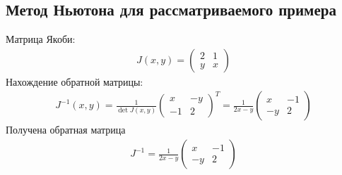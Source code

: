 \subsection{Метод Ньютона для рассматриваемого примера}
Матрица Якоби:
\begin{align}
	J(x,y) = \begin{pmatrix}
		         2 & 1 \\
		         y & x
	         \end{pmatrix}
\end{align}
Нахождение обратной матрицы:
\begin{align*}
	J^{-1}(x,y) = \frac{1}{\det J(x,y)} \begin{pmatrix}
		                                    x  & -y \\
		                                    -1 & 2
	                                    \end{pmatrix}^T = \frac{1}{2x-y}\begin{pmatrix}
		                                                                    x  & -1 \\
		                                                                    -y & 2
	                                                                    \end{pmatrix}
\end{align*}
Получена обратная матрица
\begin{align}\label{eq:inv-j-example}
	J^{-1} =  \frac{1}{2x-y}\begin{pmatrix}
		                        x  & -1 \\
		                        -y & 2
	                        \end{pmatrix}
\end{align}

